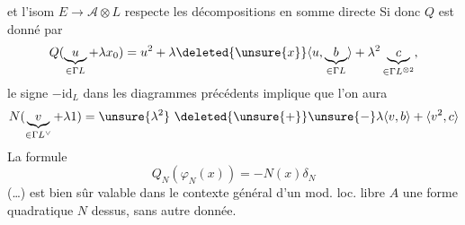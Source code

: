 et l'isom $E\longrightarrow\mathcal A\otimes L$ respecte les décompositions en somme directe
Si donc $Q$ est donné par
\[
Q(\underbrace{u}_{\in\Gamma L}+\lambda x_0)=u^2+\lambda\deleted{\unsure{x}}\langle u,\underbrace{b}_{\in\Gamma L}\rangle+\lambda^2\underbrace{c}_{\in\Gamma L^{\otimes2}},
\]
le signe $-\mathrm{id}_L$ dans les diagrammes précédents implique que l'on aura
\[
N(\underbrace{v}_{\in\Gamma L^\vee}+\lambda1)=\unsure{\lambda^2}\ \deleted{\unsure{+}}\unsure{-}\lambda\langle v,b\rangle+\langle v^2,c\rangle
\]
La formule
\[
\boxed{Q_N(\varphi_N(x))=-N(x)\delta_N}
\]
(\ldots) est bien sûr valable dans le contexte général d'un mod. loc. libre $A$   une forme quadratique  $N$ dessus, sans autre donnée.

